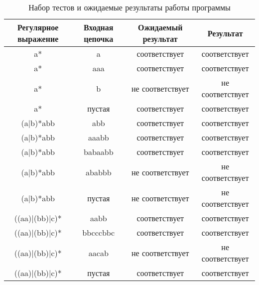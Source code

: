 \documentclass[a4paper]{bmstu}
\begin{document}
\begin{table}[H]
    \centering
	\caption{Набор тестов и ожидаемые результаты работы программы}
    \label{tbl:tests}
	\begin{tabular}{|c|c|c|c|}
        \hline
        \begin{minipage}[t]{4cm}\centering \textbf{Регулярное выражение}\end{minipage} &
        \begin{minipage}[t]{4cm}\centering \textbf{Входная цепочка}\end{minipage} &
        \begin{minipage}[t]{4cm}\centering \textbf{Ожидаемый результат}\end{minipage} &
        \begin{minipage}[t]{4cm}\centering \textbf{Результат}\end{minipage} \\ \hline
        a* & a & соответствует & соответствует \\ \hline
        a* & aaa & соответствует & соответствует \\ \hline
        a* & b & не соответствует & не соответствует \\ \hline
        a* & пустая & соответствует & соответствует \\ \hline

        (a|b)*abb & abb & соответствует & соответствует \\ \hline
        (a|b)*abb & aaabb & соответствует & соответствует \\ \hline
        (a|b)*abb & babaabb & соответствует & соответствует \\ \hline
        (a|b)*abb & ababbb & не соответствует & не соответствует \\ \hline
        (a|b)*abb & пустая & не соответствует & не соответствует \\ \hline
        
        ((aa)|(bb)|c)* & aabb & соответствует & соответствует \\ \hline
        ((aa)|(bb)|c)* & bbcccbbc & соответствует & соответствует \\ \hline
        ((aa)|(bb)|c)* & aacab & не соответствует & не соответствует \\ \hline
        ((aa)|(bb)|c)* & пустая & соответствует & соответствует \\ \hline
    \end{tabular}
\end{table}
\end{document}
